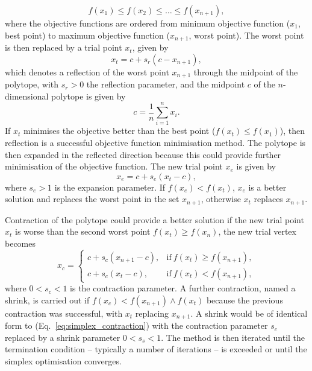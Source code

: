 \documentclass[../main.tex]{subfiles}
\begin{document}
\begin{equation}
f\left(x_{1}\right) \leq f\left(x_{2}\right) \leq \ldots \leq f\left(x_{n+1}\right),
\label{eq:simplex_polytope_objective_functions}
\end{equation}
where the objective functions are ordered from minimum objective function ($x_{1}$, best point) to maximum objective function ($x_{n+1}$, worst point). The worst point is then replaced by a trial point $x_{t}$, given by
\begin{equation}
x_{t} = c+s_{r}\left(c-x_{n+1}\right),
\label{eq:simplex_trial_point}    
\end{equation}
which denotes a reflection of the worst point $x_{n+1}$ through the midpoint of the polytope, with $s_{r} > 0$ the reflection parameter, and the midpoint $c$ of the $n$-dimensional polytope is given by
\begin{equation}
c = \frac{1}{n}\sum_{i=1}^{n}x_{i}.
\label{eq:polytope_centroid_simplex}
\end{equation}
If $x_{t}$ minimises the objective better than the best point ($f\left(x_{t}\right) \leq f\left(x_{1}\right)$), then reflection is a successful objective function minimisation method. The polytope is then expanded in the reflected direction because this could provide further minimisation of the objective function. The new trial point $x_{e}$ is given by
\begin{equation}
x_{e} = c+s_{e}\left(x_{t}-c\right),
\label{eq:simplex_expansion}    
\end{equation}
where $s_{e} > 1$ is the expansion parameter. If $f\left(x_{e}\right) < f\left(x_{t}\right)$, $x_{e}$ is a better solution and replaces the worst point in the set $x_{n+1}$, otherwise $x_{t}$ replaces $x_{n+1}$. 

Contraction of the polytope could provide a better solution if the new trial point $x_{t}$ is worse than the second worst point $f\left(x_{t}\right) \geq f\left(x_{n}\right)$, the new trial vertex becomes
\begin{equation}
x_{c} = 
\begin{cases}
c+s_{c}\left(x_{n+1}-c\right), & \text{if}  ~f\left(x_{t}\right) \geq f\left(x_{n+1}\right), \\
c+s_{c}\left(x_{t}-c\right), & \text{if}  ~f\left(x_{t}\right) < f\left(x_{n+1}\right),
\end{cases}
\label{eq:simplex_contraction}
\end{equation}
where $0 < s_{c} < 1$ is the contraction parameter. A further contraction, named a shrink, is carried out if $f\left(x_{c}\right) < f\left(x_{n+1}\right) \land f\left(x_{t}\right)$ because the previous contraction was successful, with $x_{t}$ replacing $x_{n+1}$. A shrink would be of identical form to (Eq.~\ref{eq:simplex_contraction}) with the contraction parameter $s_{c}$ replaced by a shrink parameter $0 < s_{s} < 1$. The method is then iterated until the termination condition -- typically a number of iterations -- is exceeded or until the simplex optimisation converges. 
\end{document}
